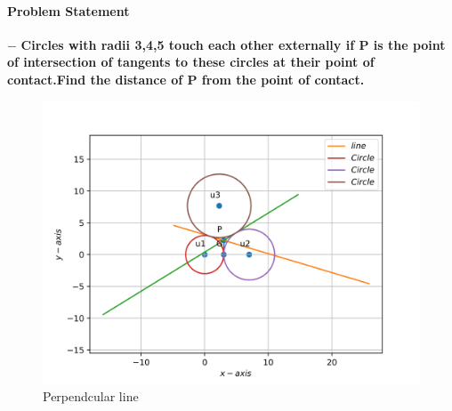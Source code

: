 \documentclass[10pt, a4paper]{article}
\title{\mytitle}
\author{\myauthor\hspace{1em}\\\contact\\FWC22086\hspace{6.5em}IITH\hspace{0.5em}\mymodule\hspace{6em}MATRICES}
\date{}
\begin{document}
 \maketitle
 \paragraph*{\large Problem Statement}
$-$ \textbf{ Circles with radii 3,4,5 touch each other externally if P is the point of intersection of tangents to these circles at their point of contact.Find the distance of P from the point of contact.}
 
\begin{figure}[h]
\centering
\includegraphics[width=1\columnwidth]{circle1-1.png}
\caption{Perpendcular line}
\end{figure}
\end{document}
